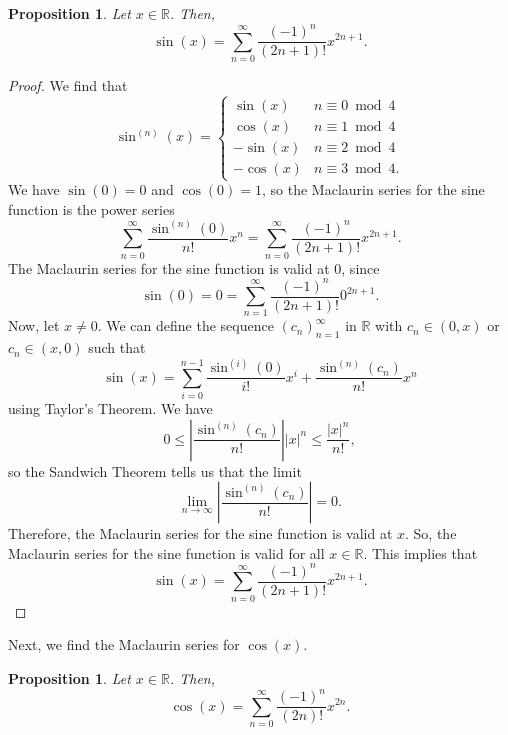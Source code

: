 \documentclass[a4paper, openany]{memoir}
\theoremstyle{definition}
\theoremstyle{plain}
\newtheorem{proposition}[definition]{Proposition}
\begin{document}
\begin{proposition}
Let $x \in \mathbb{R}$. Then,
\[\sin (x) = \sum_{n=0}^{\infty} \frac{(-1)^n}{(2n+1)!} x^{2n+1}.\]
\end{proposition}
\begin{proof}
We find that
\[\sin^{(n)}(x) = \begin{cases}
\sin (x) & n \equiv 0 \bmod{4} \\
\cos (x) & n \equiv 1 \bmod{4} \\
-\sin (x) & n \equiv 2 \bmod{4} \\
-\cos (x) & n \equiv 3 \bmod{4}.
\end{cases}\]
We have $\sin (0) = 0$ and $\cos (0) = 1$, so the Maclaurin series for the sine function is the power series
\[\sum_{n=0}^{\infty} \frac{\sin^{(n)}(0)}{n!} x^n = \sum_{n=0}^{\infty} \frac{(-1)^n}{(2n+1)!} x^{2n+1}.\]
The Maclaurin series for the sine function is valid at 0, since
\[\sin(0) = 0 = \sum_{n=1}^{\infty} \frac{(-1)^n}{(2n+1)!} 0^{2n+1}.\]
Now, let $x \neq 0$. We can define the sequence $(c_n)_{n=1}^{\infty}$ in $\mathbb{R}$ with $c_n \in (0, x)$ or $c_n \in (x, 0)$ such that
\[\sin(x) = \sum_{i=0}^{n-1} \frac{\sin^{(i)}(0)}{i!} x^i + \frac{\sin^{(n)}(c_n)}{n!} x^n\]
using Taylor's Theorem. We have
\[0 \leqslant \left|\frac{\sin^{(n)}(c_n)}{n!}\right| |x|^n \leqslant \frac{|x|^n}{n!},\]
so the Sandwich Theorem tells us that the limit
\[\lim_{n \to \infty} \left|\frac{\sin^{(n)}(c_n)}{n!}\right| = 0.\]
Therefore, the Maclaurin series for the sine function is valid at $x$. So, the Maclaurin series for the sine function is valid for all $x \in \mathbb{R}$. This implies that
\[\sin (x) = \sum_{n=0}^{\infty} \frac{(-1)^n}{(2n+1)!} x^{2n+1}.\]
\end{proof}
\noindent Next, we find the Maclaurin series for $\cos (x)$.
\begin{proposition}
Let $x \in \mathbb{R}$. Then,
\[\cos (x) = \sum_{n=0}^{\infty} \frac{(-1)^n}{(2n)!} x^{2n}.\]
\end{proposition}
\end{document}
